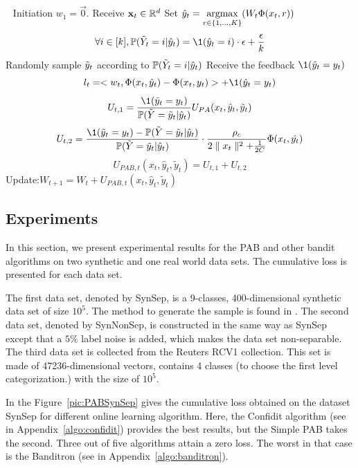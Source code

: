 \begin{algo}[PAB]
\label{algo:pab}
\begin{algorithmic}
   \STATE $\ \ $
	\STATE   Initiation $w_1=\vec 0$.
	\STATE   Receive $\mathbf{x}_t\in \mathbb{R}^d$
	\STATE   Set $\hat{y}_t= \underset{r\in \{1,\dots,K\}}{\text{argmax}}(W_t \Phi(x_t,r))$    
    \[\forall i \in [k], \mathbb{P}(\tY = i|\hy)=\1 (\hy=i)\cdot \epsilon+\frac{\epsilon}{k}\]	
	\STATE    Randomly sample $\tilde{y}_t$ according to $\mathbb{P}(\tilde{Y}_t=i|\hat{y}_t)$
	\STATE	 Receive the feedback $\1(\tilde{y}_t=y_t)$
   \[ l_t = < w_t,\Phi(x_t,\hat{y}_t)-\Phi(x_t,y_t) >+ \1(\hat{y}_t = y_t)\]
 \[U_{t,1} =\frac{\1(\tilde{y}_t = y_t)}{\mathbb{P}(\tilde{Y}=\tilde{y}_t|\hat{y}_t)}U_{PA}(x_t,\hat{y}_t,\tilde{y}_t) \]
\[U_{t,2} =\frac{\1(\tilde{y}_t = y_t)- \mathbb{P}(\tilde{Y} =\tilde{y}_t|\hat{y}_t)}{\mathbb{P}(\tilde{Y} =\tilde{y}_t|\hat{y}_t)}\cdot \frac{\rho_c}{2\parallel{x_t}\parallel^2+\frac{1}{2C}}\Phi(x_t,\hat{y_t})\]
\[U_{PAB,t}(x_t,\hat{y}_t,\tilde{y}_t) = U_{t,1} + U_{t,2}\]
	\STATE	Update:$W_{t+1}=W_t+U_{PAB,t}(x_t,\hat{y}_t,\tilde{y}_t)$
    \ENDFOR
\end{algorithmic}
\end{algo}
\subsection{Experiments}
\label{subsec:EPAB}
In this section, we present experimental results for the PAB and other bandit algorithms on two synthetic and one real world data sets. The cumulative loss is presented for each data set.

The first data set, denoted by SynSep, is a 9-classes, 400-dimensional synthetic data set of size $10^5$. The method to generate the sample is found in \cite{kakade2008efficient}. The second data set, denoted by SynNonSep, is constructed in the same way as SynSep except that a $5\%$ label noise is added, which makes the data set non-separable. The third data set is collected from the Reuters RCV1 collection. This set is made of 47236-dimensional vectors, contains 4 classes (to choose the first level categorization.) with the size of $10^5$.

In the Figure~\ref{pic:PABSynSep} gives the cumulative loss obtained on the dataset SynSep for different online learning algorithm. Here, the Confidit algorithm (see in Appendix~\ref{algo:confidit}) provides the best results, but the Simple PAB takes the second. Three out of five algorithms attain a zero loss. The worst in that case is the Banditron (see in Appendix~\ref{algo:banditron}). 

